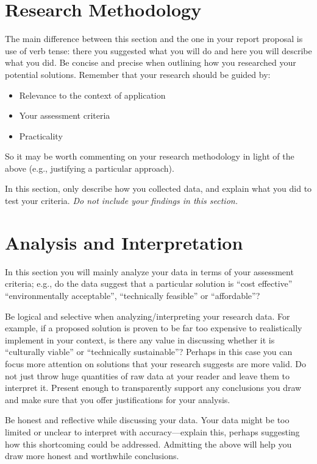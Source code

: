 \documentclass[peerreview]{IEEEtran}
\begin{document}
\section{Research Methodology}
The main difference between this section and the one in your report proposal is use of verb tense: there you suggested what you will do and here you will describe what you did. Be concise and precise when outlining how you researched your potential solutions. 
Remember that your research should be guided by: 
\begin{itemize}
\item Relevance to the context of application  
\item Your assessment criteria 
\item Practicality 
\end{itemize}
So it may be worth commenting on your research methodology in light of the above (e.g., justifying a particular approach).  

In this section, only describe how you collected data, and explain what you did to test your criteria.  \emph{Do not include your findings in this section.}

\section{Analysis and Interpretation}
 In this section you will mainly analyze your data in terms of your assessment criteria; e.g., do the data suggest that a particular solution is ``cost effective'' ``environmentally acceptable'', ``technically feasible'' or ``affordable''?
   
Be logical and selective when analyzing/interpreting your research data.  For example, if a proposed solution is proven to be far too expensive to realistically implement in your context, is there any value in discussing whether it is ``culturally viable'' or ``technically sustainable''? Perhaps in this case you can focus more attention on solutions that your research suggests are more valid.  Do not just throw huge quantities of raw data at your reader and leave them to interpret it. Present enough to transparently support any conclusions you draw and make sure that you offer justifications for your analysis.  

Be honest and reflective while discussing your data. Your data might be too limited or unclear to interpret with accuracy---explain this, perhaps suggesting how this shortcoming could be addressed. Admitting the above will help you draw more honest and worthwhile conclusions.  
\end{document}

